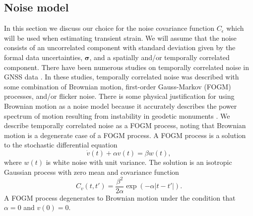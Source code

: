 \documentclass[10pt,a4paper]{article}
\begin{document}
\subsection{Noise model}\label{sec:NoiseModel}
In this section we discuss our choice for the noise covariance function $C_\epsilon$ which will be used when estimating transient strain. We will assume that the noise consists of an uncorrelated component with standard deviation given by the formal data uncertainties, $\bm{\sigma}$, and a spatially and/or temporally correlated component. There have been numerous studies on temporally correlated noise in GNSS data \citep[e.g.,][]{Zhang1997,Mao1999,Williams2004,Langbein2008}. In these studies, temporally correlated noise was described with some combination of Brownian motion, first-order Gauss-Markov (FOGM) processes, and/or flicker noise. There is some physical justification for using Brownian motion as a noise model because it accurately describes the power spectrum of motion resulting from instability in geodetic monuments \citep[e.g.,][]{Wyatt1982,Wyatt1989,Langbein1997}. We describe temporally correlated noise as a FOGM process, noting that Brownian motion is a degenerate case of a FOGM process. A FOGM process is a solution to the stochastic differential equation
\begin{equation}
\dot{v}(t) + \alpha v(t) = \beta w(t),
\end{equation}
where $w(t)$ is white noise with unit variance. The solution is an isotropic Gaussian process with zero mean and covariance function
\begin{equation}\label{eq:FOGM}
C_v(t,t') = \frac{\beta^2}{2\alpha}\exp\left(-\alpha|t - t'|\right). 
\end{equation}
A FOGM process degenerates to Brownian motion under the condition that $\alpha = 0$ and $v(0) = 0$. 
\end{document}
